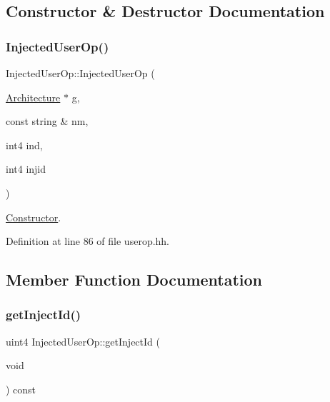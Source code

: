 \subsection{Constructor \& Destructor Documentation}
\mbox{\label{class_injected_user_op_ac13cad210c1ecb0f372ce4bb6fcdb47d}} 
\subsubsection{\texorpdfstring{InjectedUserOp()}{InjectedUserOp()}}
{\footnotesize\ttfamily Injected\+User\+Op\+::\+Injected\+User\+Op (\begin{DoxyParamCaption}\item[{\mbox{\hyperlink{class_architecture}{Architecture}} $\ast$}]{g,  }\item[{const string \&}]{nm,  }\item[{int4}]{ind,  }\item[{int4}]{injid }\end{DoxyParamCaption})\hspace{0.3cm}{\ttfamily [inline]}}



\mbox{\hyperlink{class_constructor}{Constructor}}. 



Definition at line 86 of file userop.\+hh.



\subsection{Member Function Documentation}
\mbox{\label{class_injected_user_op_adbbdc913ccab5c4b3f1eca442dd5f93c}} 
\subsubsection{\texorpdfstring{getInjectId()}{getInjectId()}}
{\footnotesize\ttfamily uint4 Injected\+User\+Op\+::get\+Inject\+Id (\begin{DoxyParamCaption}\item[{void}]{ }\end{DoxyParamCaption}) const\hspace{0.3cm}{\ttfamily [inline]}}



